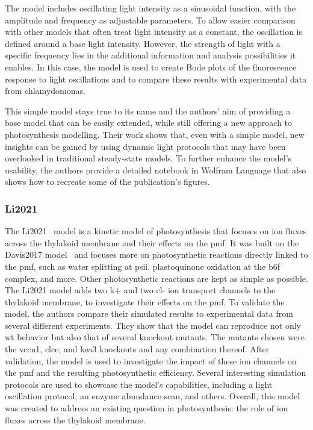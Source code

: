 The model includes oscillating light intensity as a sinusoidal function, with the amplitude and frequency as adjustable parameters. To allow easier comparison with other models that often treat light intensity as a constant, the oscillation is defined around a base light intensity. However, the strength of light with a specific frequency lies in the additional information and analysis possibilities it enables. In this case, the model is used to create Bode plots of the fluorescence response to light oscillations and to compare these results with experimental data from \gls{chlamydomonas}.

This simple model stays true to its name and the authors' aim of providing a base model that can be easily extended, while still offering a new approach to photosynthesis modelling. Their work shows that, even with a simple model, new insights can be gained by using dynamic light protocols that may have been overlooked in traditional steady-state models. To further enhance the model's usability, the authors provide a detailed notebook in Wolfram Language that also shows how to recreate some of the publication's figures.

\subsubsection{Li2021}

The Li2021~\cite{liImpactIonFluxes2021} model is a kinetic model of photosynthesis that focuses on ion fluxes across the thylakoid membrane and their effects on the \gls{pmf}. It was built on the Davis2017 model~\cite{davisHackingThylakoidProton2017} and focuses more on photosynthetic reactions directly linked to the \gls{pmf}, such as water splitting at \gls{psii}, plastoquinone oxidation at the \gls{b6f} complex, and more. Other photosynthetic reactions are kept as simple as possible. The Li2021 model adds two \gls{k+} and two \gls{cl-} ion transport channels to the thylakoid membrane, to investigate their effects on the \gls{pmf}. To validate the model, the authors compare their simulated results to experimental data from several different experiments. They show that the model can reproduce not only \gls{wt} behavior but also that of several knockout mutants. The mutants chosen were the \gls{vccn1}, \gls{clce}, and \gls{kea3} knockouts and any combination thereof. After validation, the model is used to investigate the impact of these ion channels on the \gls{pmf} and the resulting photosynthetic efficiency. Several interesting simulation protocols are used to showcase the model's capabilities, including a light oscillation protocol, an enzyme abundance scan, and others. Overall, this model was created to address an existing question in photosynthesis: the role of ion fluxes across the thylakoid membrane.

